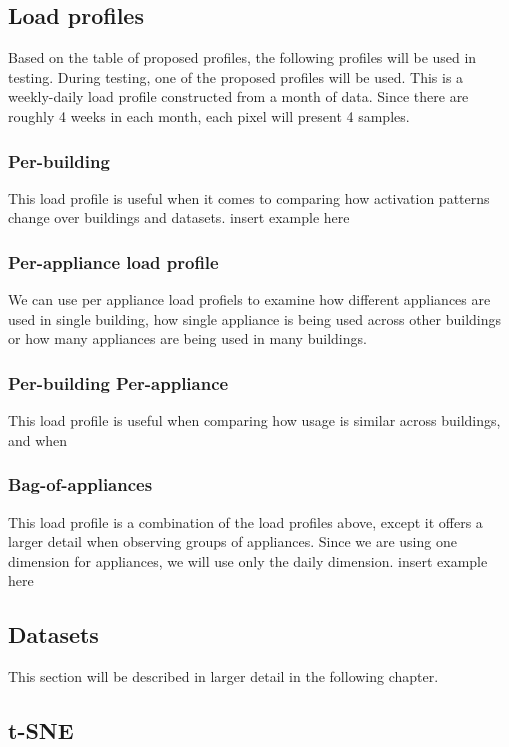 \subsection{Load profiles}

Based on the table of proposed profiles, the following profiles will be used in testing.
During testing, one of the proposed profiles will be used.
This is a weekly-daily load profile constructed from a month of data. 
Since there are roughly 4 weeks in each month, each pixel will present 4 samples. 

\subsubsection{Per-building}
This load profile is useful when it comes to comparing how activation patterns change over buildings and datasets.
insert example here

\subsubsection{Per-appliance load profile}
We can use per appliance load profiels to examine how different appliances 
are used in single building, how single appliance is being used across other buildings
or how many appliances are being used in many buildings.

\subsubsection{Per-building Per-appliance}
This load profile is useful when comparing how usage is similar across buildings, and when

\subsubsection{Bag-of-appliances}
This load profile is a combination of the load profiles above,
except it offers a larger detail when observing groups of appliances.
Since we are using one dimension for appliances, we will use only the daily dimension.
insert example here

\subsection{Datasets}
This section will be described in larger detail in the following chapter.

\subsection{t-SNE}

